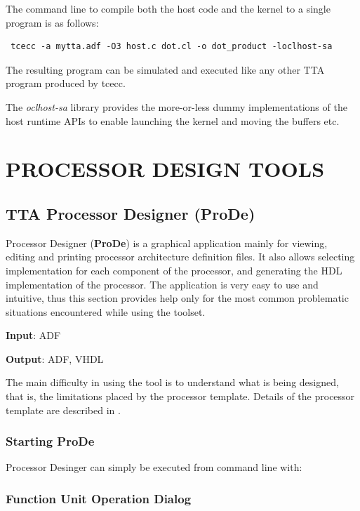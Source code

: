 \documentclass[twoside]{tceusermanual}
\begin{document}
The command line to compile both the host code and the kernel to
a single program is as follows:

\begin{verbatim}
 tcecc -a mytta.adf -O3 host.c dot.cl -o dot_product -loclhost-sa
\end{verbatim}

The resulting program can be simulated and executed like any 
other TTA program produced by tcecc.

The \textit{oclhost-sa} library provides the more-or-less dummy
implementations of the host runtime APIs to enable launching the
kernel and moving the buffers etc. 

\chapter{PROCESSOR DESIGN TOOLS}
\label{chapter:procgen}

\section{TTA Processor Designer (ProDe)}
\label{sec:prode}

Processor Designer (\textbf{ProDe}) is a graphical application mainly for
viewing, editing and printing processor architecture definition files. 
It also allows selecting implementation for each component of the processor,
and generating the HDL implementation of the processor. The application is
very easy to use and intuitive, thus this section provides help only for the
most common problematic situations encountered while using the toolset.

\textbf{Input}: ADF

\textbf{Output}: ADF, VHDL

The main difficulty in using the tool is to understand what is being
designed, that is, the limitations placed by the processor template. 
Details of the processor template are described in \cite{ADF-specs}.


\subsection{Starting ProDe}

Processor Desinger can simply be executed from command line with:


\subsection{Function Unit Operation Dialog}
\end{document}
